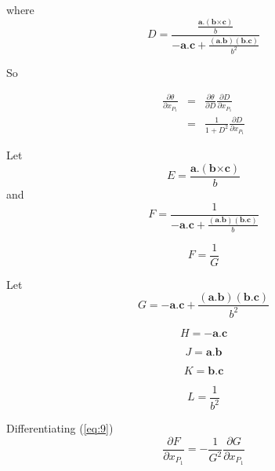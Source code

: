 \documentclass[a4paper,twocolumn,9pt]{article}
\begin{document}
where
\begin{displaymath}
  D = \frac{\frac{\mathbf{a}.(\mathbf{b} \mathbf{\times}\mathbf{c})} {b}}{-\mathbf{a}.\mathbf{c}+\frac{(\mathbf{a}.\mathbf{b})(\mathbf{b}.\mathbf{c})}{b^2}}
\end{displaymath}

So

\begin{eqnarray}
  \label{eq:df}
  \frac{\partial \theta}{\partial x_{P_1}} & = & 
  \frac{\partial \theta}{\partial D} \frac{\partial D}{\partial x_{P_1}} \\
  & = & \frac{1}{1+D^2}\frac{\partial D}{\partial x_{P_1}}
\end{eqnarray}

Let
\begin{displaymath}
  E = \frac{\mathbf{a}.(\mathbf{b} \mathbf{\times}\mathbf{c})}{b}
\end{displaymath}
and 
\begin{displaymath}
  F = \frac{1}{-\mathbf{a}.\mathbf{c}+\frac{(\mathbf{a}.\mathbf{b})(\mathbf{b}.\mathbf{c})}{b}}
\end{displaymath}

\begin{equation}
  \label{eq:9}
  F = \frac{1}{G}
\end{equation}

Let
\begin{displaymath}
  G = -\mathbf{a}.\mathbf{c}+\frac{(\mathbf{a}.\mathbf{b})(\mathbf{b}.\mathbf{c})}{b^2}
\end{displaymath}

\begin{displaymath}
  H =  -\mathbf{a}.\mathbf{c}
\end{displaymath}

\begin{displaymath}
  J = \mathbf{a}.\mathbf{b}
\end{displaymath}

\begin{displaymath}
  K = \mathbf{b}.\mathbf{c}
\end{displaymath}

\begin{displaymath}
  L = \frac{1}{b^2}
\end{displaymath}

Differentiating  (\ref{eq:9})
\begin{displaymath}
  \frac{\partial F}{\partial x_{P_1}} = -\frac{1}{G^2}\frac{\partial G}{\partial x_{P_1}}
\end{displaymath}
\end{document}
